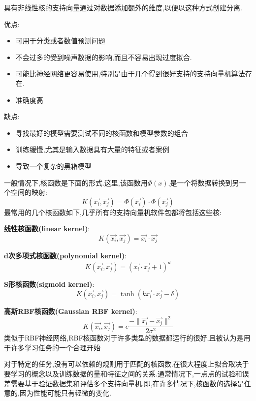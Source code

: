 \documentclass[11pt,a4paper,oneside]{book}
\begin{document}
具有非线性核的支持向量通过对数据添加额外的维度,以便以这种方式创建分离.
\begin{tcolorbox}[colback=pink!10!white,colframe=pink!100!black]
优点:
\begin{itemize}
	\item 可用于分类或者数值预测问题
	\item 不会过多的受到噪声数据的影响,而且不容易出现过度拟合.
	\item 可能比神经网络更容易使用,特别是由于几个得到很好支持的支持向量机算法存在.
	\item 准确度高
\end{itemize}
缺点:
\begin{itemize}
	\item 寻找最好的模型需要测试不同的核函数和模型参数的组合
	\item 训练缓慢,尤其是输入数据具有大量的特征或者案例
	\item 导致一个复杂的黑箱模型
\end{itemize}
\end{tcolorbox}

一般情况下,核函数是下面的形式.这里,该函数用$\Phi(x)$,是一个将数据转换到另一个空间的映射:
\begin{equation}
K(\vec{x_i},\vec{x_j})=\Phi(\vec{x_i})\cdot\Phi(\vec{x_j})
\end{equation}
最常用的几个核函数如下,几乎所有的支持向量机软件包都将包括这些核:
\begin{tcolorbox}[colback=blue!7!white,colframe=blue!40]
\textbf{线性核函数(linear kernel)}:
\begin{equation}
	K(\vec{x_i},\vec{x_j})=\vec{x_i}\cdot\vec{x_j}
\end{equation}
\end{tcolorbox}
\begin{tcolorbox}[colback=blue!7!white,colframe=blue!40]
\textbf{d次多项式核函数(polynomial kernel)}:
\begin{equation}
	K(\vec{x_i},\vec{x_j})=(\vec{x_i}\cdot\vec{x_j}+1)^d
\end{equation}
\end{tcolorbox}
\begin{tcolorbox}[colback=blue!7!white,colframe=blue!40]
\textbf{S形核函数(sigmoid kernel)}:
\begin{equation}
	K(\vec{x_i},\vec{x_j})=\tanh(k\vec{x_i}\cdot\vec{x_j}-\delta)
\end{equation}
\end{tcolorbox}
\begin{tcolorbox}[colback=blue!7!white,colframe=blue!40]
\textbf{高斯RBF核函数(Gaussian RBF kernel)}:
\begin{equation}
	K(\vec{x_i},\vec{x_j})=e\frac{-\parallel\vec{x_i}-\vec{x_j}\parallel^2}{2\sigma^2}
\end{equation}
类似于RBF神经网络,RBF核函数对于许多类型的数据都运行的很好,且被认为是用于许多学习任务的一个合理开始
\end{tcolorbox}
对于特定的任务,没有可以依赖的规则用于匹配的核函数.在很大程度上拟合取决于要学习的概念以及训练数据的量和特征之间的关系.通常情况下,一点点的试验和误差需要基于验证数据集和评估多个支持向量机.即,在许多情况下,核函数的选择是任意的,因为性能可能只有轻微的变化.
\end{document}
